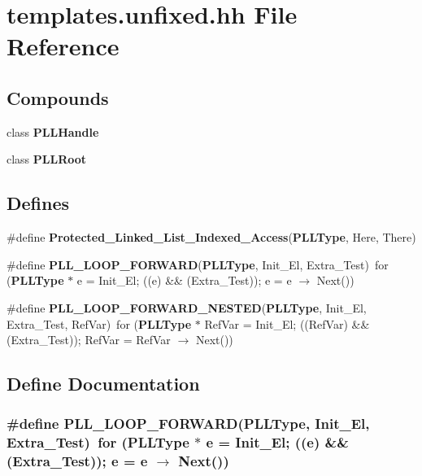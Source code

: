 \section{templates.unfixed.hh File Reference}
\label{templates_8unfixed_8hh}
\subsection*{Compounds}
\begin{CompactItemize}
\item 
class {\bf PLLHandle}
\item 
class {\bf PLLRoot}
\end{CompactItemize}
\subsection*{Defines}
\begin{CompactItemize}
\item 
\#define {\bf Protected\_\-Linked\_\-List\_\-Indexed\_\-Access}({\bf PLLType}, Here, There)
\item 
\#define {\bf PLL\_\-LOOP\_\-FORWARD}({\bf PLLType}, Init\_\-El, Extra\_\-Test)\ for ({\bf PLLType} $\ast$ e = Init\_\-El; ((e) \&\& (Extra\_\-Test)); e = e $\rightarrow$ Next())
\item 
\#define {\bf PLL\_\-LOOP\_\-FORWARD\_\-NESTED}({\bf PLLType}, Init\_\-El, Extra\_\-Test, Ref\-Var)\ for ({\bf PLLType} $\ast$ Ref\-Var = Init\_\-El; ((Ref\-Var) \&\& (Extra\_\-Test)); Ref\-Var = Ref\-Var $\rightarrow$ Next())
\end{CompactItemize}


\subsection{Define Documentation}
\subsubsection{\setlength{\rightskip}{0pt plus 5cm}\#define PLL\_\-LOOP\_\-FORWARD({\bf PLLType}, Init\_\-El, Extra\_\-Test)\ for ({\bf PLLType} $\ast$ e = Init\_\-El; ((e) \&\& (Extra\_\-Test)); e = e $\rightarrow$ Next())}\label{templates_8unfixed_8hh_a1}




